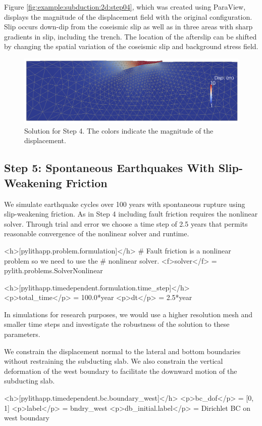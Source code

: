Figure \vref{fig:example:subduction:2d:step04}, which was created using
ParaView, displays the magnitude of the displacement field with the
original configuration. Slip occurs down-dip from the coseismic slip
as well as in three areas with sharp gradients in slip, including
the trench. The location of the afterslip can be shifted by changing
the spatial variation of the coseismic slip and background stress
field.

\begin{figure}
  \includegraphics[width=4.5in]{examples/figs/subduction2d_step01_soln}
  \caption{Solution for Step 4. The colors indicate the magnitude of
    the displacement.}
  \label{fig:example:subduction:2d:step04}
\end{figure}


\subsection{Step 5: Spontaneous Earthquakes With Slip-Weakening Friction}

We simulate earthquake cycles over 100 years with spontaneous rupture
using slip-weakening friction. As in Step 4 including fault friction
requires the nonlinear solver. Through trial and error we choose a
time step of 2.5 years that permits reasonable convergence of the
nonlinear solver and runtime. 
\begin{cfg}
<h>[pylithapp.problem.formulation]</h>
# Fault friction is a nonlinear problem so we need to use the
# nonlinear solver.
<f>solver</f> = pylith.problems.SolverNonlinear

<h>[pylithapp.timedependent.formulation.time_step]</h>
<p>total_time</p> = 100.0*year
<p>dt</p> = 2.5*year
\end{cfg}
In simulations for research purposes, we
would use a higher resolution mesh and smaller time steps and
investigate the robustness of the solution to these parameters.

We constrain the displacement normal to the lateral and bottom
boundaries without restraining the subducting slab. We also constrain
the vertical deformation of the west boundary to facilitate the
downward motion of the subducting slab.
\begin{cfg}
<h>[pylithapp.timedependent.bc.boundary_west]</h>
<p>bc_dof</p> = [0, 1]
<p>label</p> = bndry_west
<p>db_initial.label</p> = Dirichlet BC on west boundary
\end{cfg}

